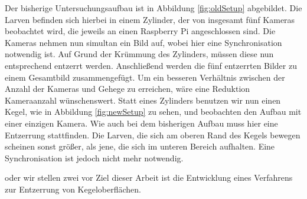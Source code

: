 Der bisherige Untersuchungsaufbau ist in Abbildung \ref{fig:oldSetup} abgebildet. Die Larven befinden sich hierbei in einem Zylinder, der von insgesamt fünf Kameras beobachtet wird, die jeweils an einen Raspberry Pi angeschlossen sind. Die Kameras nehmen nun simultan ein Bild auf, wobei hier eine Synchronisation notwendig ist. Auf Grund der Krümmung des Zylinders, müssen diese nun entsprechend entzerrt werden. Anschließend werden die fünf entzerrten Bilder zu einem Gesamtbild zusammengefügt. 
Um ein besseren Verhältnis zwischen der Anzahl der Kameras und Gehege zu erreichen, wäre eine Reduktion Kameraanzahl wünschenswert. 
Statt eines Zylinders benutzen wir nun einen Kegel, wie in Abbildung \ref{fig:newSetup} zu sehen, und beobachten den Aufbau mit einer einzigen Kamera. Wie auch bei dem bisherigen Aufbau muss hier eine Entzerrung stattfinden. Die Larven, die sich am oberen Rand des Kegels bewegen scheinen sonst größer, als jene, die sich im unteren Bereich aufhalten. Eine Synchronisation ist jedoch nicht mehr notwendig. 

oder wir stellen zwei vor
Ziel dieser Arbeit ist die Entwicklung eines Verfahrens zur Entzerrung von Kegeloberflächen. 



